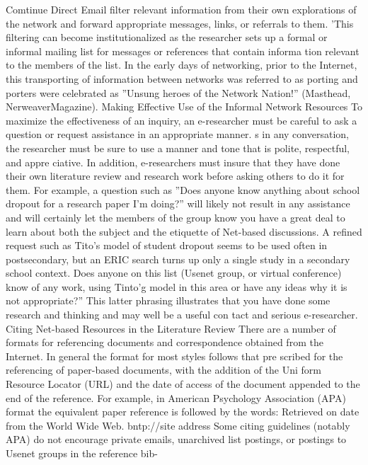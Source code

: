 \documentclass{beamer}
\begin{document}
\begin{frame}{Comtinue Direct Email}
filter relevant information from their own explorations of the network and
forward appropriate messages, links, or referrals to them. ’This filtering
can become institutionalized as the researcher sets up a formal or informal
mailing list for messages or references that contain informa tion relevant
to the members of the list. In the early days of networking, prior to the
Internet, this transporting of information between networks was referred to
as porting and porters were celebrated as ”Unsung heroes of the Network
Nation!” (Masthead, NerweaverMagazine).
Making Effective Use of the Informal Network Resources
To maximize the effectiveness of an inquiry, an e-researcher must be careful
to ask a question or request assistance in an appropriate manner. s in any
conversation, the researcher must be sure to use a manner and tone that is
polite, respectful, and appre ciative. In addition, e-researchers must insure
that they have done their own literature review and research work before
asking others to do it for them.
For example, a question such as ”Does anyone know anything about
school dropout for a research paper I’m doing?” will likely not result in
any assistance and will certainly let the members of the group know you
have a great deal to learn about both the subject and the etiquette of
Net-based discussions. A refined request such as Tito’s model of student
dropout seems to be used often in postsecondary, but an ERIC search turns
up only a single study in a secondary school context. Does anyone on this
list (Usenet group, or virtual conference) know of any work, using Tinto’g
model in this area or have any ideas why it is not appropriate?” This latter
phrasing illustrates that you have done some research and thinking and
may well be a useful con tact and serious e-researcher.
Citing Net-based Resources in the Literature Review
There are a number of formats for referencing documents and correspondence
obtained from the Internet. In general the format for most styles
follows that pre scribed for the referencing of paper-based documents, with
the addition of the Uni form Resource Locator (URL) and the date of access
of the document appended to the end of the reference. For example,
in American Psychology Association (APA) format the equivalent paper
reference is followed by the words:
Retrieved on date from the World Wide Web. bntp://site address
Some citing guidelines (notably APA) do not encourage private emails,
unarchived list postings, or postings to Usenet groups in the reference bib-

\end{frame}	
\end{document}

